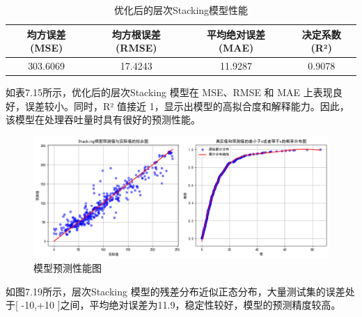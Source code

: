 \begin{table}[H]
	\centering
	\caption{优化后的层次Stacking模型性能}
	\begin{tabular}{@{}cccc@{}}
		\toprule
		 均方误差 (MSE) & 均方根误差 (RMSE) & 平均绝对误差 (MAE) & 决定系数 (R²) \\
		\midrule
		 303.6069 & 17.4243 & 11.9287 & 0.9078 \\
		\bottomrule
	\end{tabular}
\end{table}

如表7.15所示，优化后的层次Stacking 模型在 MSE、RMSE 和 MAE 上表现良好，误差较小。同时，R² 值接近 1，显示出模型的高拟合度和解释能力。因此，该模型在处理吞吐量时具有很好的预测性能。

\begin{figure}[H]
	\centering
	\includegraphics[width=0.8\linewidth]{figures/问题三888}
	\caption{模型预测性能图}
	\label{fig:888}
\end{figure}



如图7.19所示，层次Stacking 模型的残差分布近似正态分布，大量测试集的误差处于[ -10,+10 ]之间，平均绝对误差为11.9，稳定性较好，模型的预测精度较高。